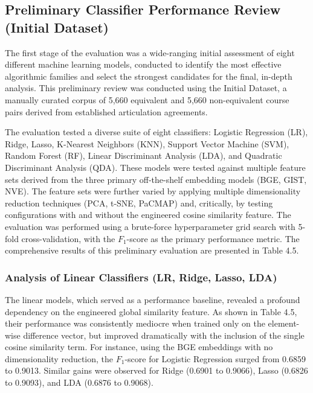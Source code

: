 \subsection{Preliminary Classifier Performance Review (Initial Dataset)}
The first stage of the evaluation was a wide-ranging initial assessment of eight different machine learning models, conducted to identify the most effective algorithmic families and select the strongest candidates for the final, in-depth analysis. This preliminary review was conducted using the Initial Dataset, a manually curated corpus of 5,660 equivalent and 5,660 non-equivalent course pairs derived from established articulation agreements.

The evaluation tested a diverse suite of eight classifiers: Logistic Regression (LR), Ridge, Lasso, K-Nearest Neighbors (KNN), Support Vector Machine (SVM), Random Forest (RF), Linear Discriminant Analysis (LDA), and Quadratic Discriminant Analysis (QDA). These models were tested against multiple feature sets derived from the three primary off-the-shelf embedding models (BGE, GIST, NVE). The feature sets were further varied by applying multiple dimensionality reduction techniques (PCA, t-SNE, PaCMAP) and, critically, by testing configurations with and without the engineered cosine similarity feature. The evaluation was performed using a brute-force hyperparameter grid search with 5-fold cross-validation, with the \(F_1\)-score as the primary performance metric. The comprehensive results of this preliminary evaluation are presented in Table 4.5.

\subsubsection{Analysis of Linear Classifiers (LR, Ridge, Lasso, LDA)}
The linear models, which served as a performance baseline, revealed a profound dependency on the engineered global similarity feature. As shown in Table 4.5, their performance was consistently mediocre when trained only on the element-wise difference vector, but improved dramatically with the inclusion of the single cosine similarity term. For instance, using the BGE embeddings with no dimensionality reduction, the \(F_1\)-score for Logistic Regression surged from 0.6859 to 0.9013. Similar gains were observed for Ridge (0.6901 to 0.9066), Lasso (0.6826 to 0.9093), and LDA (0.6876 to 0.9068).

